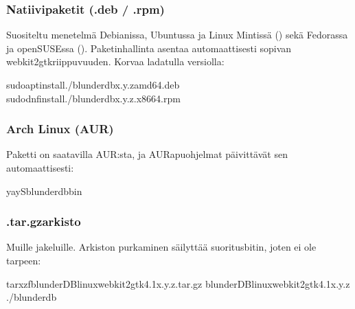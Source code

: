 \documentclass[letterpaper,10pt,finnish]{sphinxmanual}
\begin{document}
\subsubsection{Natiivipaketit (.deb / .rpm)}
\label{\detokenize{telecharge_install:paquets-natifs-deb-rpm}}
\sphinxAtStartPar
Suositeltu menetelmä Debianissa, Ubuntussa ja Linux Mintissä () sekä Fedorassa ja openSUSEssa (). Paketinhallinta asentaa automaattisesti sopivan webkit2gtk\sphinxhyphen{}riippuvuuden. Korvaa  ladatulla versiolla:

\begin{sphinxVerbatim}[commandchars=\\\{\}]
sudoaptinstall./blunderdb\PYGZus{}x.y.z\PYGZus{}amd64.deb
sudodnfinstall./blunderdb\PYGZhy{}x.y.z.x86\PYGZus{}64.rpm
\end{sphinxVerbatim}


\subsubsection{Arch Linux (AUR)}
\label{\detokenize{telecharge_install:arch-linux-aur}}
\sphinxAtStartPar
Paketti  on saatavilla AUR:sta, ja AUR\sphinxhyphen{}apuohjelmat päivittävät sen automaattisesti:

\begin{sphinxVerbatim}[commandchars=\\\{\}]
yay\PYGZhy{}Sblunderdb\PYGZhy{}bin
\end{sphinxVerbatim}


\subsubsection{.tar.gz\sphinxhyphen{}arkisto}
\label{\detokenize{telecharge_install:archive-tar-gz}}
\sphinxAtStartPar
Muille jakeluille. Arkiston purkaminen säilyttää suoritusbitin, joten  ei ole tarpeen:

\begin{sphinxVerbatim}[commandchars=\\\{\}]
tarxzfblunderDB\PYGZhy{}linux\PYGZhy{}webkit2gtk\PYGZhy{}4.1\PYGZhy{}x.y.z.tar.gz
blunderDB\PYGZhy{}linux\PYGZhy{}webkit2gtk\PYGZhy{}4.1\PYGZhy{}x.y.z
./blunderdb
\end{sphinxVerbatim}
\end{document}
